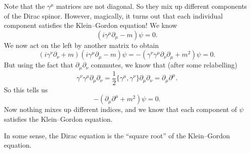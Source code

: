 \documentclass[a4paper]{article}
\begin{document}
Note that the $\gamma^\mu$ matrices are not diagonal. So they mix up different components of the Dirac spinor. However, magically, it turns out that each individual component satisfies the Klein--Gordon equation! We know
\[
  (i \gamma^\mu \partial_\mu - m) \psi = 0.
\]
We now act on the left by another matrix to obtain
\[
  (i \gamma^\nu \partial_\nu + m)(i \gamma^\mu\partial_\mu - m)\psi = -(\gamma^\nu \gamma^\mu \partial_\nu \partial_\mu + m^2)\psi = 0.
\]
But using the fact that $\partial_\mu \partial_\nu$ commutes, we know that (after some relabelling)
\[
  \gamma^\nu \gamma^\mu \partial_\mu \partial_\nu = \frac{1}{2}\{\gamma^\mu, \gamma^\nu\} \partial_\mu \partial_\nu = \partial_\mu \partial^\mu.
\]
So this tells us
\[
  -(\partial_\mu \partial^\mu + m^2) \psi = 0.
\]
Now nothing mixes up different indices, and we know that each component of $\psi$ satisfies the Klein--Gordon equation.

In some sense, the Dirac equation is the ``square root'' of the Klein--Gordon equation.
\end{document}
